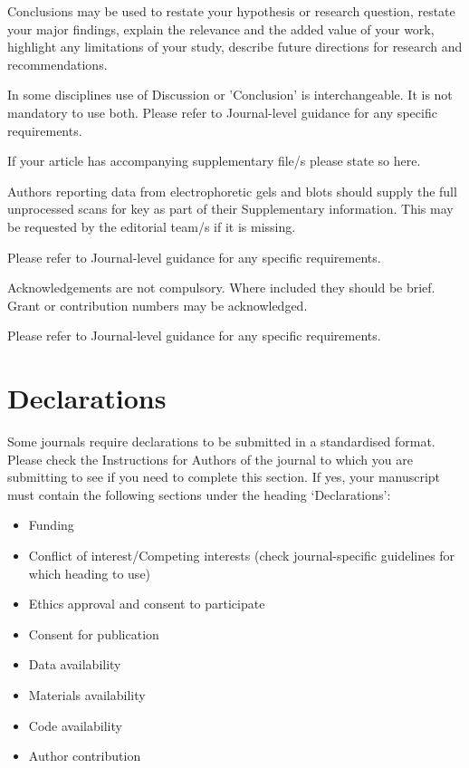 \documentclass[pdflatex,sn-mathphys-num]{sn-jnl}%
\theoremstyle{thmstyleone}%
\theoremstyle{thmstyletwo}%
\theoremstyle{thmstylethree}%
\begin{document}
Conclusions may be used to restate your hypothesis or research question, restate your major findings, explain the relevance and the added value of your work, highlight any limitations of your study, describe future directions for research and recommendations. 

In some disciplines use of Discussion or 'Conclusion' is interchangeable. It is not mandatory to use both. Please refer to Journal-level guidance for any specific requirements. 

\backmatter


If your article has accompanying supplementary file/s please state so here. 

Authors reporting data from electrophoretic gels and blots should supply the full unprocessed scans for key as part of their Supplementary information. This may be requested by the editorial team/s if it is missing.

Please refer to Journal-level guidance for any specific requirements.


Acknowledgements are not compulsory. Where included they should be brief. Grant or contribution numbers may be acknowledged.

Please refer to Journal-level guidance for any specific requirements.

\section*{Declarations}

Some journals require declarations to be submitted in a standardised format. Please check the Instructions for Authors of the journal to which you are submitting to see if you need to complete this section. If yes, your manuscript must contain the following sections under the heading `Declarations':

\begin{itemize}
\item Funding
\item Conflict of interest/Competing interests (check journal-specific guidelines for which heading to use)
\item Ethics approval and consent to participate
\item Consent for publication
\item Data availability 
\item Materials availability
\item Code availability 
\item Author contribution
\end{itemize}
\end{document}

